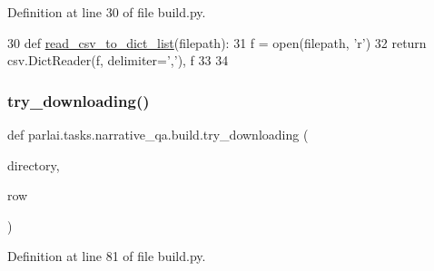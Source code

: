 Definition at line 30 of file build.\+py.


\begin{DoxyCode}
30 \textcolor{keyword}{def }\hyperlink{namespaceparlai_1_1tasks_1_1narrative__qa_1_1build_a7fae633ea705d970c2a6d56b7004f6cd}{read\_csv\_to\_dict\_list}(filepath):
31     f = open(filepath, \textcolor{stringliteral}{'r')}
32 \textcolor{stringliteral}{    }\textcolor{keywordflow}{return} csv.DictReader(f, delimiter=\textcolor{stringliteral}{','}), f
33 
34 
\end{DoxyCode}
\mbox{\label{namespaceparlai_1_1tasks_1_1narrative__qa_1_1build_a9af345566fd27c286f7fef146b2cf00b}} 
\subsubsection{\texorpdfstring{try\+\_\+downloading()}{try\_downloading()}}
{\footnotesize\ttfamily def parlai.\+tasks.\+narrative\+\_\+qa.\+build.\+try\+\_\+downloading (\begin{DoxyParamCaption}\item[{}]{directory,  }\item[{}]{row }\end{DoxyParamCaption})}



Definition at line 81 of file build.\+py.



